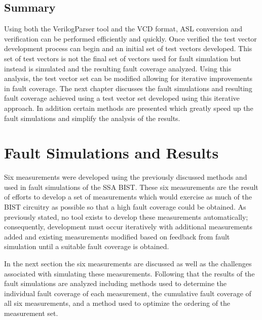 \documentclass[12pt]{report}
\begin{document}
\section{Summary}
Using both the VerilogParser tool and the VCD format, ASL conversion and verification can be performed efficiently and quickly.  Once verified the test vector development process can begin and an initial set of test vectors developed.  This set of test vectors is not the final set of vectors used for fault simulation but instead is simulated and the resulting fault coverage analyzed.  Using this analysis, the test vector set can be modified allowing for iterative improvements in fault coverage.  The next chapter discusses the fault simulations and resulting fault coverage achieved using a test vector set developed using this iterative approach.   In addition certain methods are presented which greatly speed up the fault simulations and simplify the analysis of the results.

\chapter{Fault Simulations and Results}
Six measurements were developed using the previously discussed methods and used in fault simulations of the SSA BIST.  These six measurements are the result of efforts to develop a set of measurements which would exercise as much of the BIST circuitry as possible so that a high fault coverage could be obtained.  As previously stated, no tool exists to develop these measurements automatically; consequently, development must occur iteratively with additional measurements added and existing measurements modified based on feedback from fault simulation until a suitable fault coverage is obtained.

In the next section the six measurements are discussed as well as the challenges associated with simulating these measurements.  Following that the results of the fault simulations are analyzed including methods used to determine the individual fault coverage of each measurement, the cumulative fault coverage of all six measurements, and a method used to optimize the ordering of the measurement set.
\end{document}
